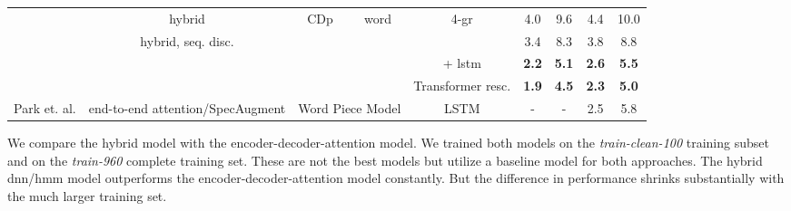 \documentclass[a4paper]{article}
\begin{document}
\begin{table*}[!t]
\begin{tabular}{|l|c|c|c|c|c|c|c|c|}
& hybrid                                    & \multirow{4}{*}{CDp}      & \multirow{4}{*}{word} & \multirow{2}{*}{4-gr} &  4.0  &  9.6  &  4.4  & 10.0  \\ \cline{2-2}\cline{6-9}
& \multirow{3}{*}{hybrid, seq. disc.}       &                           &                       &                       &  3.4  &  8.3  &  3.8  &  8.8  \\ \cline{5-9}
&                                           &                           &                       & +  \ac{lstm} & \textbf{2.2} & \textbf{5.1} & \textbf{2.6} & \textbf{5.5} \\ \cline{5-9}
&                                           &                           &                       & Transformer resc. & \textbf{1.9}  & \textbf{4.5} & \textbf{2.3} & \textbf{5.0} \\ \hline \hline
Park et. al.\cite{park2019specaugment}&  end-to-end attention/SpecAugment &\multicolumn{2}{c|}{Word Piece Model} &      LSTM              & - & - & 2.5 & 5.8 \\ \hline
\end{tabular}
\end{table*}

We compare the hybrid model with the encoder-decoder-attention model.
We trained both models on the \emph{train-clean-100} training subset and on the \emph{train-960} complete training set.
These are not the best models but utilize a baseline model for both approaches.
The hybrid \ac{dnn}/\ac{hmm} model outperforms the encoder-decoder-attention model constantly.
But the difference in performance shrinks substantially with the much larger training set.
\end{document}

